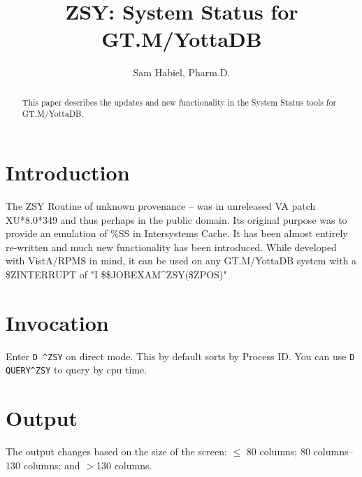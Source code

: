 \documentclass[]{article}
\title{ZSY: System Status for GT.M/YottaDB}
\author{Sam Habiel, Pharm.D.}
\begin{document}
\maketitle

\begin{abstract}
This paper describes the updates and new functionality in the System Status tools for GT.M/YottaDB.
\end{abstract}

\section{Introduction}
The ZSY Routine of unknown provenance -- was in unreleased VA patch XU*8.0*349 and thus perhaps in the public domain. Its original purpose was to provide an emulation of \%SS in Intersystems Cache. It has been almost entirely re-written and much new functionality has been introduced. While developed with VistA/RPMS in mind, it can be used on any GT.M/YottaDB system with a \$ZINTERRUPT of "I \$\$JOBEXAM\^{}ZSY(\$ZPOS)"

\section{Invocation}

Enter \texttt{D \^{}ZSY} on direct mode. This by default sorts by Process ID. You can use \texttt{D QUERY\^{}ZSY} to query by cpu time.

\section{Output}
The output changes based on the size of the screen: $\leq$ 80 columns; 80 columns--130 columns; and $>$130 columns.


\end{document}
